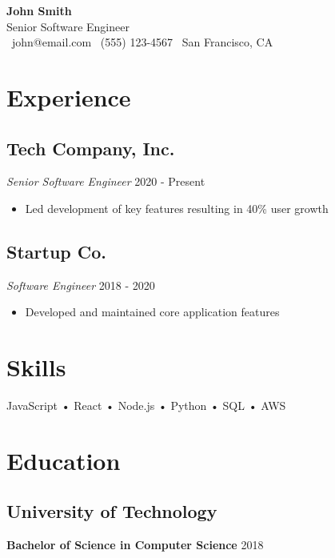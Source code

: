 \documentclass[11pt,a4paper]{article}
\begin{document}
\begin{center}
    {\Huge\textbf{John Smith}}\\[4pt]
    {\large Senior Software Engineer}\\[4pt]
    \textcolor{subheaderColor}{
        \faEnvelope\ john@email.com \quad
        \faPhone\ (555) 123-4567 \quad
        \faMapMarker\ San Francisco, CA
    }
\end{center}

\section{Experience}
\subsection*{Tech Company, Inc.}
\textit{Senior Software Engineer} \hfill 2020 - Present\\
\begin{itemize}[leftmargin=*]
    \item Led development of key features resulting in 40\% user growth
\end{itemize}

\subsection*{Startup Co.}
\textit{Software Engineer} \hfill 2018 - 2020\\
\begin{itemize}[leftmargin=*]
    \item Developed and maintained core application features
\end{itemize}

\section{Skills}
JavaScript • React • Node.js • Python • SQL • AWS

\section{Education}
\subsection*{University of Technology}
\textbf{Bachelor of Science in Computer Science} \hfill 2018
\end{document}
